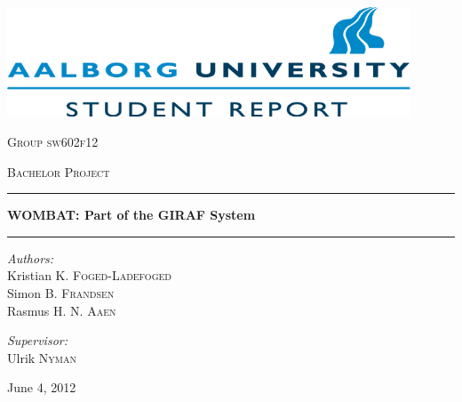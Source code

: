 \begin{titlepage}

\begin{center}

\vspace{1cm}
\includegraphics[width=0.9\textwidth]{Images/aau_logo_en.png}\\[1cm]  
\vspace{1.5cm}  

\textsc{\LARGE Group sw602f12}\\[1.5cm]
\vspace{0.5cm}

\textsc{\Large Bachelor Project}\\[0.5cm]


\hrule
\vspace{0.4cm}

{ \huge \bfseries WOMBAT: Part of the GIRAF System}\\[0.4cm]

\hrule
\vspace{3cm}

\begin{minipage}{0.55\textwidth}
\begin{flushleft} \large
\vspace{1.25cm}
\textit{Authors:}\\
Kristian K. \textsc{Foged-Ladefoged}\\

Simon B. \textsc{Frandsen}\\

Rasmus H. N. \textsc{Aaen}
\end{flushleft}
\end{minipage}
\begin{minipage}{0.35\textwidth}
\begin{flushright} \large
\textit{Supervisor:} \\
Ulrik \textsc{Nyman}
\end{flushright}
\end{minipage}

\vfill

{\large June 4, 2012}

\end{center}

\end{titlepage}
